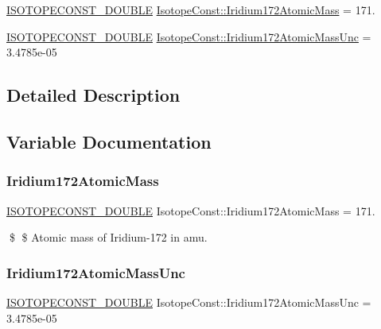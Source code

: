 \begin{DoxyCompactItemize}
\item 
\mbox{\hyperlink{group___isotope_const-_macros_ga8f45a7272ce02c0b4c65c44636ed719a}{I\+S\+O\+T\+O\+P\+E\+C\+O\+N\+S\+T\+\_\+\+D\+O\+U\+B\+LE}} \mbox{\hyperlink{group___isotope_const-_iridium-_ir172_ga5f67b5ca4177e43c621b1773443dd24c}{Isotope\+Const\+::\+Iridium172\+Atomic\+Mass}} = 171.
\item 
\mbox{\hyperlink{group___isotope_const-_macros_ga8f45a7272ce02c0b4c65c44636ed719a}{I\+S\+O\+T\+O\+P\+E\+C\+O\+N\+S\+T\+\_\+\+D\+O\+U\+B\+LE}} \mbox{\hyperlink{group___isotope_const-_iridium-_ir172_ga5715d852394d60284935cfb95718ae71}{Isotope\+Const\+::\+Iridium172\+Atomic\+Mass\+Unc}} = 3.\+4785e-\/05
\end{DoxyCompactItemize}


\subsection{Detailed Description}


\subsection{Variable Documentation}
\mbox{\label{group___isotope_const-_iridium-_ir172_ga5f67b5ca4177e43c621b1773443dd24c}} 
\subsubsection{\texorpdfstring{Iridium172\+Atomic\+Mass}{Iridium172AtomicMass}}
{\footnotesize\ttfamily \mbox{\hyperlink{group___isotope_const-_macros_ga8f45a7272ce02c0b4c65c44636ed719a}{I\+S\+O\+T\+O\+P\+E\+C\+O\+N\+S\+T\+\_\+\+D\+O\+U\+B\+LE}} Isotope\+Const\+::\+Iridium172\+Atomic\+Mass = 171.}

\$ \$ Atomic mass of Iridium-\/172 in amu. \mbox{\label{group___isotope_const-_iridium-_ir172_ga5715d852394d60284935cfb95718ae71}} 
\subsubsection{\texorpdfstring{Iridium172\+Atomic\+Mass\+Unc}{Iridium172AtomicMassUnc}}
{\footnotesize\ttfamily \mbox{\hyperlink{group___isotope_const-_macros_ga8f45a7272ce02c0b4c65c44636ed719a}{I\+S\+O\+T\+O\+P\+E\+C\+O\+N\+S\+T\+\_\+\+D\+O\+U\+B\+LE}} Isotope\+Const\+::\+Iridium172\+Atomic\+Mass\+Unc = 3.\+4785e-\/05}


